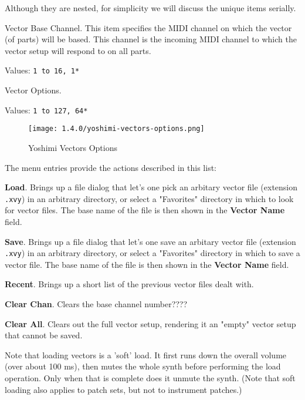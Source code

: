    Although they are nested, for simplicity we will discuss the unique items
   serially.

   \setcounter{ItemCounter}{0}      %

   Vector Base Channel.
   This item specifies the MIDI channel on which the vector (of parts) will be
   based.  This channel is the incoming MIDI channel to which the vector setup
   will respond to on all parts.

   Values: \texttt{1 to 16, 1*}

   Vector Options.

   Values: \texttt{1 to 127, 64*}

\begin{figure}[H]
   \centering 
   \texttt{[image: 1.4.0/yoshimi-vectors-options.png]}
   \caption{Yoshimi Vectors Options}
   \label{fig:yoshimi_vectors_options}
\end{figure}

   The menu entries provide the actions described in this list:

   \begin{enumber}
      \item \textbf{Load}.
         Brings up a file dialog that let's one pick an arbitary vector file
         (extension \texttt{.xvy}) in an arbitrary directory, or select a
         "Favorites" directory in which to look for vector files.
         The base name of the file is then shown in the \textbf{Vector Name}
         field.
      \item \textbf{Save}.
         Brings up a file dialog that let's one save an arbitary vector file
         (extension \texttt{.xvy}) in an arbitrary directory, or select a
         "Favorites" directory in which to save a vector file.
         The base name of the file is then shown in the \textbf{Vector Name}
         field.
      \item \textbf{Recent}.
         Brings up a short list of the previous vector files dealt with.
      \item \textbf{Clear Chan}.
         Clears the base channel number????
      \item \textbf{Clear All}.
         Clears out the full vector setup, rendering it an "empty" vector setup
         that cannot be saved.
   \end{enumber}

   Note that loading vectors is a 'soft' load. It first runs down the overall
   volume (over about 100 ms), then mutes the whole synth before performing
   the load operation. Only when that is complete does it unmute the synth. 
   (Note that soft loading also applies to patch sets, but not to instrument
   patches.)


